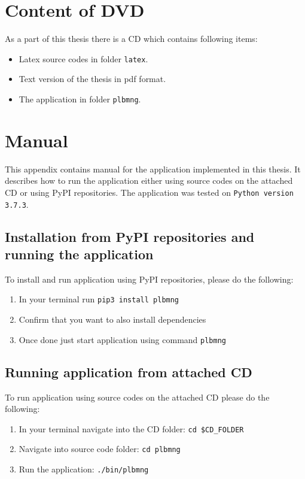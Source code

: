 \chapter{Content of DVD}
As a part of this thesis there is a CD which contains following items:
\begin{itemize}
	\item Latex source codes in folder \texttt{latex}.
	\item Text version of the thesis in pdf format.
	\item The application in folder \texttt{plbmng}.
\end{itemize}

\chapter{Manual}
This appendix contains manual for the application implemented in this thesis. It describes how to run the application either using source codes on the attached CD or using PyPI repositories. The application was tested on \texttt{Python version 3.7.3}.
\section{Installation from PyPI repositories and running the application}
To install and run application using PyPI repositories, please do the following:\\
\begin{enumerate}
	\item In your terminal run \texttt{pip3 install plbmng}
	\item Confirm that you want to also install dependencies
	\item Once done just start application using command \texttt{plbmng}
\end{enumerate}

\section{Running application from attached CD}
To run application using source codes on the attached CD please do the following:\\
\begin{enumerate}
	\item In your terminal navigate into the CD folder: \texttt{cd \$CD\_FOLDER}
	\item Navigate into source code folder: \texttt{cd plbmng}
	\item Run the application: \texttt{./bin/plbmng}
\end{enumerate}